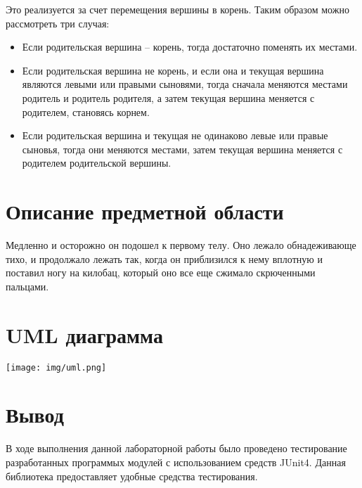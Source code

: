 Это реализуется за счет перемещения вершины в корень.
Таким образом можно рассмотреть три случая:
\begin{itemize}
\item Если родительская вершина -- корень, тогда достаточно поменять их местами.
\item Если родительская вершина не корень, и если она и текущая вершина являются
левыми или правыми сыновями, тогда сначала меняются местами родитель и родитель
родителя, а затем текущая вершина меняется с родителем, становясь корнем.
\item Если родительская вершина и текущая не одинаково левые или правые сыновья,
тогда они меняются местами, затем текущая вершина меняется с родителем родительской
вершины.

\end{itemize}
\section{Описание предметной области}
Медленно и осторожно он подошел к первому телу. Оно лежало обнадеживающе тихо,
и продолжало лежать так, когда он приблизился к нему вплотную и поставил ногу
на килобац, который оно все еще сжимало скрюченными пальцами.
\section{UML диаграмма}
\texttt{[image: img/uml.png]}
\section{Вывод}
В ходе выполнения данной лабораторной работы было проведено тестирование
разработанных программых модулей с использованием средств JUnit4. Данная библиотека
предоставляет удобные средства тестирования.


